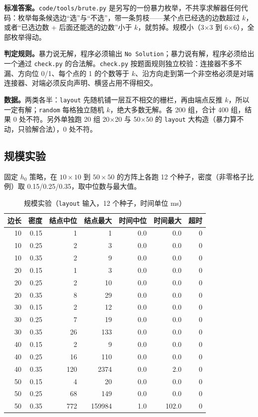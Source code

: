 \documentclass[12pt,a4paper,fontset=windows]{ctexart}
\newcommand{\code}[1]{\texttt{#1}}
\begin{document}
\textbf{标准答案。}\code{code/tools/brute.py} 是另写的一份暴力枚举，不共享求解器任何代码：枚举每条候选边“选”与“不选”，带一条剪枝——某个点已经选的边数超过 $k$，或者“已选边数 + 后面还能选的边数”小于 $k$，就剪掉。规模小（3×3 到 6×6），全部枚举得动。

\textbf{判定规则。}暴力说无解，程序必须输出 \code{No Solution}；暴力说有解，程序必须给出一个通过 \code{check.py} 的合法解。\code{check.py} 按题面规则独立校验：连接器不多不漏、方向位 0/1、每个点的 1 的个数等于 $k$、沿方向走到第一个非空格必须是对端连接器、对端必须反向声明、横竖占用不得相交。

\textbf{数据。}两类各半：\code{layout} 先随机铺一层互不相交的栅栏，再由端点反推 $k$，所以一定有解；\code{random} 每格独立随机 $k$，绝大多数无解。各 200 组，合计 400 组，结果 0 处不符。另外单独跑 20 组 20×20 与 50×50 的 \code{layout} 大构造（暴力算不动，只验解合法），0 处不符。

\subsection{规模实验}

固定 $h_0$ 策略，在 $10\times10$ 到 $50\times50$ 的方阵上各跑 12 个种子，密度（非零格子比例）取 0.15/0.25/0.35，取中位数与最大值。

\begin{table}[htbp]
\centering
\caption{规模实验（\code{layout} 输入，12 个种子，时间单位 ms）}
\label{tab:scale}
\small
\begin{tabular}{rrrrrrr}
\toprule
\rowcolor{gray!12}边长 & 密度 & 结点中位 & 结点最大 & 时间中位 & 时间最大 & 超时 \\
\midrule
10 & 0.15 & 1 & 1 & 0.0 & 0.0 & 0 \\
10 & 0.25 & 2 & 3 & 0.0 & 0.0 & 0 \\
10 & 0.35 & 2 & 9 & 0.0 & 0.0 & 0 \\
20 & 0.15 & 1 & 3 & 0.0 & 0.0 & 0 \\
20 & 0.25 & 2 & 10 & 0.0 & 0.0 & 0 \\
20 & 0.35 & 8 & 29 & 0.0 & 0.0 & 0 \\
30 & 0.15 & 2 & 12 & 0.0 & 0.0 & 0 \\
30 & 0.25 & 7 & 19 & 0.0 & 0.0 & 0 \\
30 & 0.35 & 26 & 133 & 0.0 & 0.0 & 0 \\
40 & 0.15 & 2 & 9 & 0.0 & 0.0 & 0 \\
40 & 0.25 & 16 & 110 & 0.0 & 0.0 & 0 \\
40 & 0.35 & 120 & 2374 & 0.0 & 2.0 & 0 \\
50 & 0.15 & 4 & 20 & 0.0 & 0.0 & 0 \\
50 & 0.25 & 68 & 149 & 0.0 & 0.0 & 0 \\
50 & 0.35 & 772 & 159984 & 1.0 & 102.0 & 0 \\
\bottomrule
\end{tabular}
\end{table}
\end{document}
